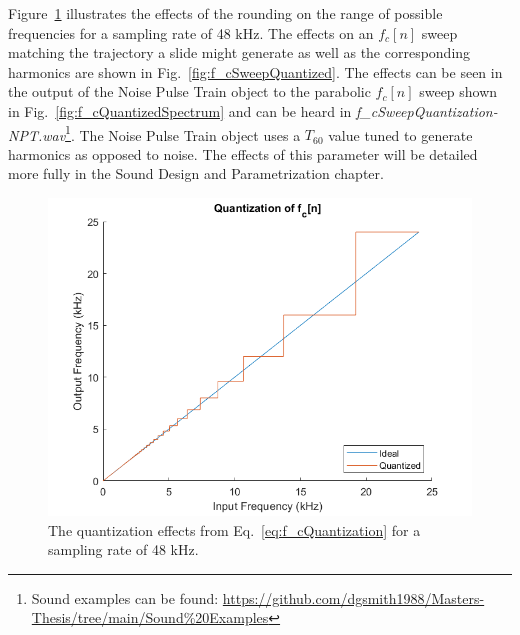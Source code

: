 \documentclass[../main.tex]{subfiles}
\begin{document}
Figure~\ref{fig:f_cQuantized} illustrates the effects of the rounding on the range of possible frequencies for a sampling rate of 48 kHz. The effects on an $f_c[n]$ sweep matching the trajectory a slide might generate as well as the corresponding harmonics are shown in Fig.~\ref{fig:f_cSweepQuantized}. The effects can be seen in the output of the Noise Pulse Train object to the parabolic $f_c[n]$ sweep shown in Fig.~\ref{fig:f_cQuantizedSpectrum} and can be heard in \emph{f\_cSweepQuantization-NPT.wav}\footnote{Sound examples can be found: \url{https://github.com/dgsmith1988/Masters-Thesis/tree/main/Sound\%20Examples}}. The Noise Pulse Train object uses a $T_{60}$ value tuned to generate harmonics as opposed to noise. The effects of this parameter will be detailed more fully in the Sound Design and Parametrization chapter.

\begin{figure}[h]
    \centering
    \includegraphics[scale=.50]{./images/plots/f_cQuantization.png}
    \caption{The quantization effects from Eq.~\ref{eq:f_cQuantization} for a sampling rate of 48 kHz.}
    \label{fig:f_cQuantized}
\end{figure}

\clearpage
\end{document}
